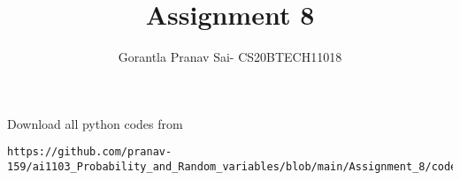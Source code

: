 \documentclass[journal,12pt,twocolumn]{IEEEtran}
\DeclareMathOperator*{\Res}{Res}
\begin{document}
\newcommand{\BEQA}{\begin{eqnarray}}
\newcommand{\EEQA}{\end{eqnarray}}
\newcommand{\define}{\stackrel{\triangle}{=}}

\raggedbottom
\setlength{\parindent}{0pt}
\providecommand{\mbf}{\mathbf}
\providecommand{\pr}[1]{\ensuremath{\Pr\left(#1\right)}}
\providecommand{\qfunc}[1]{\ensuremath{Q\left(#1\right)}}
\providecommand{\sbrak}[1]{\ensuremath{{}\left[#1\right]}}
\providecommand{\lsbrak}[1]{\ensuremath{{}\left[#1\right.}}
\providecommand{\rsbrak}[1]{\ensuremath{{}\left.#1\right]}}
\providecommand{\brak}[1]{\ensuremath{\left(#1\right)}}
\providecommand{\lbrak}[1]{\ensuremath{\left(#1\right.}}
\providecommand{\rbrak}[1]{\ensuremath{\left.#1\right)}}
\providecommand{\cbrak}[1]{\ensuremath{\left\{#1\right\}}}
\providecommand{\lcbrak}[1]{\ensuremath{\left\{#1\right.}}
\providecommand{\rcbrak}[1]{\ensuremath{\left.#1\right\}}}
\theoremstyle{remark}
\newtheorem{rem}{Remark}
\newcommand{\sgn}{\mathop{\mathrm{sgn}}}
\providecommand{\abs}[1]{\vert#1\vert}
\providecommand{\res}[1]{\Res\displaylimits_{#1}} 
\providecommand{\norm}[1]{\lVert#1\rVert}
\providecommand{\mtx}[1]{\mathbf{#1}}
\providecommand{\mean}[1]{E[ #1 ]}
\providecommand{\fourier}{\overset{\mathcal{F}}{ \rightleftharpoons}}
\providecommand{\system}{\overset{\mathcal{H}}{ \longleftrightarrow}}
\newcommand{\solution}{\noindent \textbf{Solution: }}
\newcommand{\cosec}{\,\text{cosec}\,}
\providecommand{\dec}[2]{\ensuremath{\overset{#1}{\underset{#2}{\gtrless}}}}
\newcommand{\myvec}[1]{\ensuremath{\begin{pmatrix}#1\end{pmatrix}}}
\newcommand{\mydet}[1]{\ensuremath{\begin{vmatrix}#1\end{vmatrix}}}
\makeatletter
{}
\makeatother
\let\StandardTheFigure\thefigure
\let\vec\mathbf
\renewcommand{\thefigure}{\theproblem}
\def\putbox#1#2#3{\makebox[0in][l]{\makebox[#1][l]{}\raisebox{\baselineskip}[0in][0in]{\raisebox{#2}[0in][0in]{#3}}}}
     \def\rightbox#1{\makebox[0in][r]{#1}}
     \def\centbox#1{\makebox[0in]{#1}}
     \def\topbox#1{\raisebox{-\baselineskip}[0in][0in]{#1}}
     \def\midbox#1{\raisebox{-0.5\baselineskip}[0in][0in]{#1}}
\vspace{3cm}
\title{Assignment 8}
\author{Gorantla Pranav Sai- CS20BTECH11018}
\maketitle
\newpage
\bigskip
\renewcommand{\thefigure}{\theenumi}
\renewcommand{\thetable}{\theenumi}
Download all python codes from 
\begin{lstlisting}
https://github.com/pranav-159/ai1103_Probability_and_Random_variables/blob/main/Assignment_8/codes/experimental_verification_Assignment8.py
\end{lstlisting}
\end{document}
